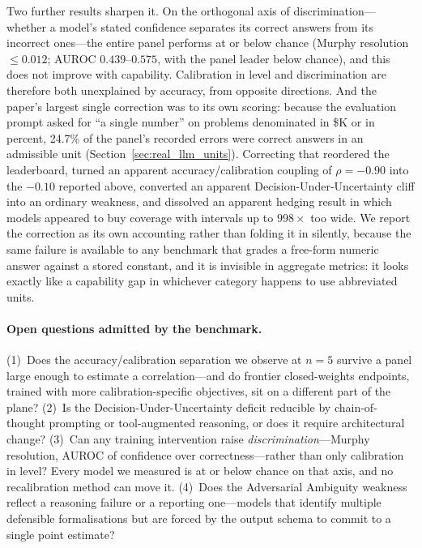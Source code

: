 \documentclass{article}
\begin{document}
Two further results sharpen it. On the orthogonal axis of discrimination---whether a model's stated confidence separates its correct answers from its incorrect ones---the entire panel performs at or below chance (Murphy resolution $\leq 0.012$; AUROC $0.439$--$0.575$, with the panel leader below chance), and this does not improve with capability. Calibration in level and discrimination are therefore both unexplained by accuracy, from opposite directions. And the paper's largest single correction was to its own scoring: because the evaluation prompt asked for ``a single number'' on problems denominated in \$K or in percent, 24.7\% of the panel's recorded errors were correct answers in an admissible unit (Section~\ref{sec:real_llm_units}). Correcting that reordered the leaderboard, turned an apparent accuracy/calibration coupling of $\rho = -0.90$ into the $-0.10$ reported above, converted an apparent Decision-Under-Uncertainty cliff into an ordinary weakness, and dissolved an apparent hedging result in which models appeared to buy coverage with intervals up to $998\times$ too wide. We report the correction as its own accounting rather than folding it in silently, because the same failure is available to any benchmark that grades a free-form numeric answer against a stored constant, and it is invisible in aggregate metrics: it looks exactly like a capability gap in whichever category happens to use abbreviated units.

\paragraph{Open questions admitted by the benchmark.}
(1)~Does the accuracy/calibration separation we observe at $n = 5$ survive a panel large enough to estimate a correlation---and do frontier closed-weights endpoints, trained with more calibration-specific objectives, sit on a different part of the plane?
(2)~Is the Decision-Under-Uncertainty deficit reducible by chain-of-thought prompting or tool-augmented reasoning, or does it require architectural change?
(3)~Can any training intervention raise \emph{discrimination}---Murphy resolution, AUROC of confidence over correctness---rather than only calibration in level? Every model we measured is at or below chance on that axis, and no recalibration method can move it.
(4)~Does the Adversarial Ambiguity weakness reflect a reasoning failure or a reporting one---models that identify multiple defensible formalisations but are forced by the output schema to commit to a single point estimate?
\end{document}
